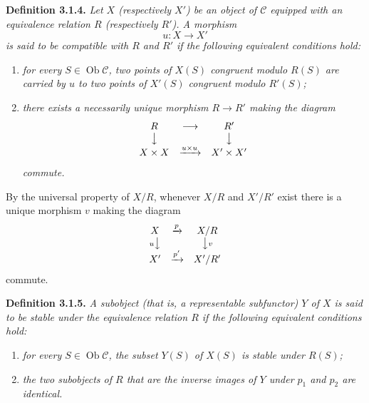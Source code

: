 \medskip
\noindent{}\textbf{Definition 3.1.4.}
\textit{Let \(X\) (respectively \(X'\)) be an object of \(\mathscr C\)
equipped with an equivalence relation \(R\) (respectively \(R'\)). A morphism
\[
  u:X\longrightarrow X'
\]
is said to be \emph{compatible with \(R\) and \(R'\)} if the following
equivalent conditions hold:}
\begin{enumerate}
  \item[(i)] \textit{for every \(S\in\operatorname{Ob}\mathscr C\), two
  points of \(X(S)\) congruent modulo \(R(S)\) are carried by \(u\) to two
  points of \(X'(S)\) congruent modulo \(R'(S)\);}
  \item[(ii)] \textit{there exists a necessarily unique morphism \(R\to R'\)
  making the diagram}
  \[
    \begin{array}{ccc}
      R & \longrightarrow & R'\\
      \big\downarrow && \big\downarrow\\
      X\times X & \xrightarrow{u\times u} & X'\times X'
    \end{array}
  \]
  \textit{commute.}
\end{enumerate}

By the universal property of \(X/R\), whenever \(X/R\) and \(X'/R'\)
exist there is a unique morphism \(v\) making the diagram
\[
  \begin{array}{ccc}
    X & \xrightarrow{p} & X/R\\
    {\scriptstyle u}\big\downarrow && \big\downarrow{\scriptstyle v}\\
    X' & \xrightarrow{p'} & X'/R'
  \end{array}
\]
commute.

\medskip
\noindent{}\textbf{Definition 3.1.5.}
\textit{A subobject (that is, a representable subfunctor) \(Y\) of \(X\) is
said to be \emph{stable under the equivalence relation \(R\)} if the following
equivalent conditions hold:}
\begin{enumerate}
  \item[(i)] \textit{for every \(S\in\operatorname{Ob}\mathscr C\), the
  subset \(Y(S)\) of \(X(S)\) is stable under \(R(S)\);}
  \item[(ii)] \textit{the two subobjects of \(R\) that are the inverse
  images of \(Y\) under \(p_1\) and \(p_2\) are identical.}
\end{enumerate}

